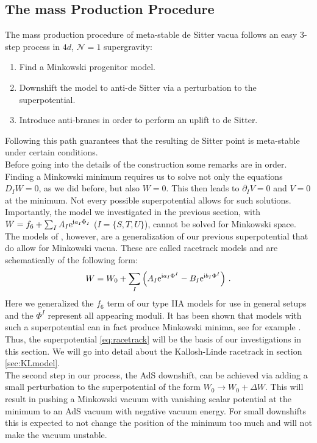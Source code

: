 \documentclass[a4paper,12pt,twoside,openright]{report}
\newcommand{\be}{\begin{equation}}
\newcommand{\ee}{\end{equation}}
\def\rmi{{\rm i}}
\def\rme{{\rm e}}
\begin{document}
\subsection{The mass Production Procedure}
The mass production procedure of meta-stable de Sitter vacua follows an easy 3-step process in $4d$, $\mathcal{N}=1$ supergravity:
\begin{enumerate}
\item Find a Minkowski progenitor model.
\item Downshift the model to anti-de Sitter via a perturbation to the superpotential.
\item Introduce anti-branes in order to perform an uplift to de Sitter.
\end{enumerate}
Following this path guarantees that the resulting de Sitter point is meta-stable under certain conditions.\\
Before going into the details of the construction some remarks are in order. Finding a Minkowski minimum requires us to solve not only the equations $D_I W =0$, as we did before, but also $W=0$. This then leads to $\partial_I V=0$ and $V=0$ at the minimum. Not every possible superpotential allows for such solutions. Importantly, the model we investigated in the previous section, with $W = f_6 + \sum_I A_I \rme^{\rmi a_I \Phi_I}$ ($I = \{S,T,U\}$), cannot be  solved for Minkowski space. The models of \cite{Kallosh:2004yh,BlancoPillado:2005fn,Kallosh:2011qk}, however, are a generalization of our previous superpotential that do allow for Minkowski vacua. These are called racetrack models and are schematically of the following form:
\be 
W = W_0 + \sum_I \left( A_I \rme^{\rmi a_I  \Phi^I} - B_I \rme^{\rmi b_I  \Phi^I}\right)\,.
\label{eq:racetrack}
\ee
Here we generalized the $f_6$ term of our type IIA models for use in general setups and the $\Phi^I$ represent all appearing moduli. It has been shown that models with such a superpotential can in fact produce Minkowski minima, see for example \cite{Kallosh:2019zgd,Kallosh:2004yh}. Thus, the superpotential \eqref{eq:racetrack} will be the basis of our investigations in this section. We will go into detail about the Kallosh-Linde racetrack in section \ref{sec:KLmodel}.\\
The second step in our process, the AdS downshift, can be achieved via adding a small perturbation to the superpotential of the form $W_0 \to W_0 + \Delta W$. This will result in pushing a Minkowski vacuum with vanishing scalar potential at the minimum to an AdS vacuum with negative vacuum energy. For small downshifts this is expected to not change the position of the minimum too much and will not make the vacuum unstable.\\
\end{document}
